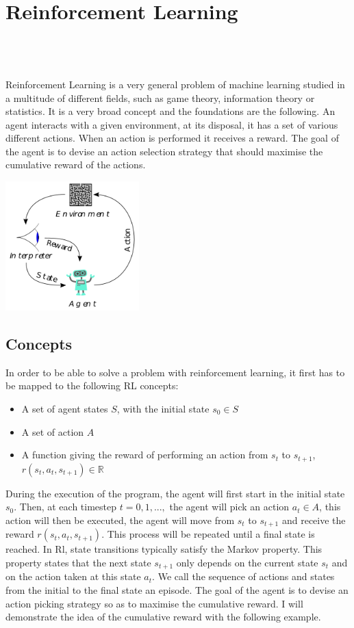 
\setcounter{chapter}{1}

\chapter{Reinforcement Learning}
\mbox{}\\
\mbox{}\\
\mbox{}\\
Reinforcement Learning\cite{kaelbling1996reinforcement} is a very general problem of machine learning studied in a multitude of different fields, such as game theory, information theory or statistics. It is a very broad concept and the foundations are the following. An agent interacts with a given environment, at its disposal, it has a set of various different actions. When an action is performed it receives a reward. The goal of the agent is to devise an action selection strategy that should maximise the cumulative reward of the actions.

\begin{center}
	\includegraphics*[height=5cm]{figures/rl_broad.png}
\end{center}

\section{Concepts}
In order to be able to solve a problem with reinforcement learning, it first has to be mapped to the following RL concepts:
\begin{itemize}
	\item A set of agent states $S$, with the initial state $s_0\in S$
	\item A set of action $A$
	\item A function giving the reward of performing an action from  $s_t$ to $s_{t+1}$, $r(s_t,a_t,s_{t+1})\in \mathbb{R}$
\end{itemize}
During the execution of the program, the agent will first start in the initial state $s_0$. Then, at each timestep $t=0,1,...,$ the agent will pick an action $a_t \in A$, this action will then be executed, the agent will move from $s_t$ to $s_{t+1}$ and receive the reward $r(s_t,a_t,s_{t+1})$. This process will be repeated until a final state is reached. In Rl, state transitions typically satisfy the Markov property. This property states that the next state $s_{t+1}$ only depends on the current state $s_t$ and on the action taken at this state $a_t$. We call the sequence of actions and states from the initial to the final state an episode. The goal of the agent is to devise an action picking strategy so as to maximise the cumulative reward. I will demonstrate the idea of the cumulative reward with the following example.
